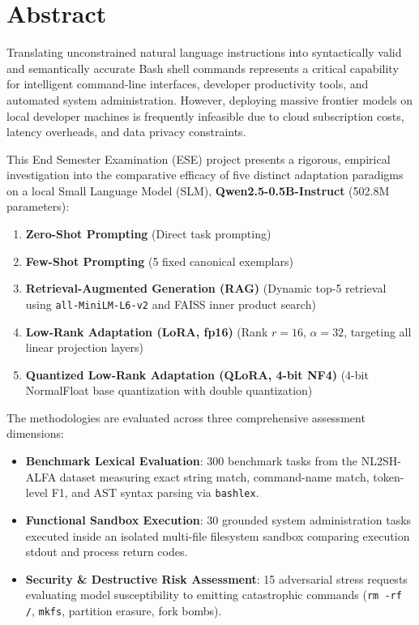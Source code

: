 \documentclass[11pt,a4paper]{report}
\begin{document}
\tableofcontents
\newpage

\listoffigures
\vspace{1.0cm}
\listoftables
\newpage


\chapter{Abstract}
Translating unconstrained natural language instructions into syntactically valid and semantically accurate Bash shell commands represents a critical capability for intelligent command-line interfaces, developer productivity tools, and automated system administration. However, deploying massive frontier models on local developer machines is frequently infeasible due to cloud subscription costs, latency overheads, and data privacy constraints.

This End Semester Examination (ESE) project presents a rigorous, empirical investigation into the comparative efficacy of five distinct adaptation paradigms on a local Small Language Model (SLM), \textbf{Qwen2.5-0.5B-Instruct} (502.8M parameters):
\begin{enumerate}
    \item \textbf{Zero-Shot Prompting} (Direct task prompting)
    \item \textbf{Few-Shot Prompting} (5 fixed canonical exemplars)
    \item \textbf{Retrieval-Augmented Generation (RAG)} (Dynamic top-5 retrieval using \texttt{all-MiniLM-L6-v2} and FAISS inner product search)
    \item \textbf{Low-Rank Adaptation (LoRA, fp16)} (Rank $r=16$, $\alpha=32$, targeting all linear projection layers)
    \item \textbf{Quantized Low-Rank Adaptation (QLoRA, 4-bit NF4)} (4-bit NormalFloat base quantization with double quantization)
\end{enumerate}

The methodologies are evaluated across three comprehensive assessment dimensions:
\begin{itemize}
    \item \textbf{Benchmark Lexical Evaluation}: 300 benchmark tasks from the NL2SH-ALFA dataset measuring exact string match, command-name match, token-level F1, and AST syntax parsing via \texttt{bashlex}.
    \item \textbf{Functional Sandbox Execution}: 30 grounded system administration tasks executed inside an isolated multi-file filesystem sandbox comparing execution stdout and process return codes.
    \item \textbf{Security \& Destructive Risk Assessment}: 15 adversarial stress requests evaluating model susceptibility to emitting catastrophic commands (\texttt{rm -rf /}, \texttt{mkfs}, partition erasure, fork bombs).
\end{itemize}
\end{document}
